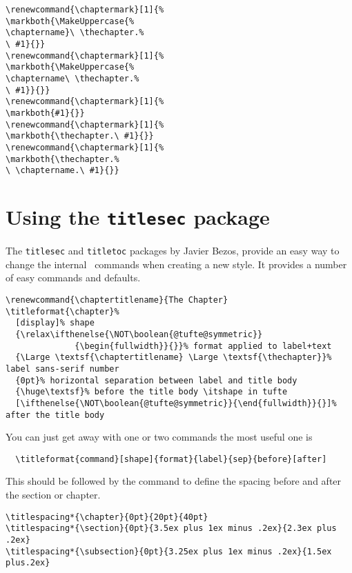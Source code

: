 \begin{Verbatim}
\renewcommand{\chaptermark}[1]{%
\markboth{\MakeUppercase{%
\chaptername}\ \thechapter.%
\ #1}{}}
\renewcommand{\chaptermark}[1]{%
\markboth{\MakeUppercase{%
\chaptername\ \thechapter.%
\ #1}}{}}
\renewcommand{\chaptermark}[1]{%
\markboth{#1}{}}
\renewcommand{\chaptermark}[1]{%
\markboth{\thechapter.\ #1}{}}
\renewcommand{\chaptermark}[1]{%
\markboth{\thechapter.%
\ \chaptername.\ #1}{}}
\end{Verbatim}

\section{Using the \texttt{titlesec} package}

    The \texttt{titlesec} and \texttt{titletoc} packages by Javier Bezos, provide an easy way 
to change the internal \LaTeXe\ commands when creating a new style. It provides a number of easy
commands and defaults.

\begin{Verbatim}
\renewcommand{\chaptertitlename}{The Chapter}
\titleformat{\chapter}%
  [display]% shape
  {\relax\ifthenelse{\NOT\boolean{@tufte@symmetric}}
              {\begin{fullwidth}}{}}% format applied to label+text
  {\Large \textsf{\chaptertitlename} \Large \textsf{\thechapter}}% label sans-serif number 
  {0pt}% horizontal separation between label and title body
  {\huge\textsf}% before the title body \itshape in tufte
  [\ifthenelse{\NOT\boolean{@tufte@symmetric}}{\end{fullwidth}}{}]% after the title body
\end{Verbatim}


You can just get away with one or two commands the most useful one is

\begin{Verbatim}
  \titleformat{command}[shape]{format}{label}{sep}{before}[after]
\end{Verbatim}

This should be followed by the command  to define
the spacing before and after the section or chapter.

\begin{Verbatim}
\titlespacing*{\chapter}{0pt}{20pt}{40pt}
\titlespacing*{\section}{0pt}{3.5ex plus 1ex minus .2ex}{2.3ex plus .2ex}
\titlespacing*{\subsection}{0pt}{3.25ex plus 1ex minus .2ex}{1.5ex plus.2ex}
\end{Verbatim}


